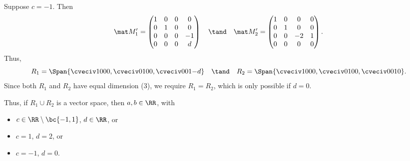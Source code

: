 \begin{solution}
\begin{ppart}
         Suppose $c = -1$. Then \[\mat M_1' = \begin{pmatrix}1 & 0 & 0 & 0 \\ 0 & 1 & 0 & 0 \\ 0 & 0 & 0 & -1 \\ 0 & 0 & 0 & d\end{pmatrix} \quad \tand \quad \mat M_2' = \begin{pmatrix}1 & 0 & 0 & 0 \\ 0 & 1 & 0 & 0 \\ 0 & 0 & -2 & 1 \\ 0 & 0 & 0 & 0 \end{pmatrix}.\] Thus, \[R_1 = \Span{\cveciv1000, \cveciv0100, \cveciv001{-d}} \quad \tand \quad R_2 = \Span{\cveciv1000, \cveciv0100, \cveciv0010}.\] Since both $R_1$ and $R_2$ have equal dimension (3), we require $R_1 = R_2$, which is only possible if $d = 0$.

        Thus, if $R_1 \cup R_2$ is a vector space, then $a, b \in \RR$, with
        \begin{itemize}
            \item $c \in \RR \setminus \bc{-1, 1}$, $d \in \RR$, or
            \item $c = 1$, $d = 2$, or
            \item $c = -1$, $d = 0$.
        \end{itemize}
    \end{ppart}
\end{solution}
